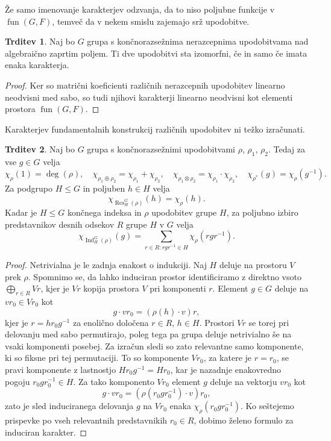 \documentclass[11pt]{book}
\DeclareMathOperator\Res{Res}
\DeclareMathOperator\Ind{Ind}
\DeclareMathOperator\fun{fun}
\theoremstyle{definition}
\theoremstyle{zgled}
\theoremstyle{odprtproblem}
\theoremstyle{domacanaloga}
\newenvironment{dokaz}
    {\color{siva}\begin{proof}}
    {\end{proof}}
\theoremstyle{izrek}
\newtheorem*{trditev}{Trditev}
\begin{document}
Že samo imenovanje karakterjev odzvanja, da to niso poljubne funkcije v $\fun(G,F)$, temveč da v nekem smislu zajemajo srž upodobitve.

\begin{trditev}
Naj bo $G$ grupa s končnorazsežnima nerazcepnima upodobitvama nad algebraično zaprtim poljem. Ti dve upodobitvi sta izomorfni, če in samo če imata enaka karakterja.
\end{trditev}
\begin{dokaz}
Ker so matrični koeficienti različnih nerazcepnih upodobitev linearno neodvisni med sabo, so tudi njihovi karakterji linearno neodvisni kot elementi prostora $\fun(G,F)$. 
\end{dokaz}

Karakterjev fundamentalnih konstrukcij različnih upodobitev ni težko izračunati.

\begin{trditev}
Naj bo $G$ grupa s končnorazsežnimi upodobitvami $\rho$, $\rho_1$, $\rho_2$. Tedaj za vse $g \in G$ velja
\[
    \chi_{\rho}(1) = \deg(\rho), \quad
    \chi_{\rho_1 \oplus \rho_2} = \chi_{\rho_1} + \chi_{\rho_2}, \quad
    \chi_{\rho_1 \otimes \rho_2} = \chi_{\rho_1} \cdot \chi_{\rho_2}, \quad
    \chi_{\rho^*}(g) = \chi_{\rho}(g^{-1}).
\]
Za podgrupo $H \leq G$ in poljuben $h \in H$ velja
\[
    \chi_{\Res^G_H(\rho)}(h) = \chi_{\rho}(h).
\]
Kadar je $H \leq G$ končnega indeksa in $\rho$ upodobitev grupe $H$, za poljubno izbiro predstavnikov desnih odsekov $R$ grupe $H$ v $G$ velja
\[
    \chi_{\Ind^G_H(\rho)}(g) = \sum_{r \in R \colon r g r^{-1} \in H} \chi_{\rho}(r g r^{-1}).
\]
\end{trditev}
\begin{dokaz}
Netrivialna je le zadnja enakost o indukciji. Naj $H$ deluje na prostoru $V$ prek $\rho$. Spomnimo se, da lahko induciran prostor identificiramo z direktno vsoto $\bigoplus_{r \in R} V r$, kjer je $Vr$ kopija prostora $V$ pri komponenti $r$. Element $g \in G$ deluje na $v r_0 \in V r_0$ kot
\[
    g \cdot v r_0 = \left( \rho(h) \cdot v \right) r,
\]
kjer je $r = h r_0 g^{-1}$ za enolično določena $r \in R$, $h \in H$. Prostori $V r$ se torej pri delovanju med sabo permutirajo, poleg tega pa grupa deluje netrivialno še na vsaki komponenti posebej. Za izračun sledi so zato relevantne samo komponente, ki so fiksne pri tej permutaciji. To so komponente $Vr_0$, za katere je $r = r_0$, se pravi komponente z lastnostjo $H r_0 g^{-1} = H r_0$, kar je nazadnje enakovredno pogoju $r_0 g r_0^{-1} \in H$. Za tako komponento $V r_0$ element $g$ deluje na vektorju $v r_0$ kot
\[
    g \cdot v r_0 = \left( \rho(r_0 g r_0^{-1}) \cdot v \right) r_0,
\]
zato je sled induciranega delovanja $g$ na $V r_0$ enaka $\chi_{\rho}(r_0 g r_0^{-1})$. Ko seštejemo prispevke po vseh relevantnih predstavnikih $r_0 \in R$, dobimo želeno formulo za induciran karakter.
\end{dokaz}
\end{document}

